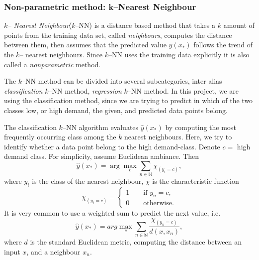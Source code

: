     \subsubsection{Non-parametric method: k--Nearest Neighbour}
        \emph{$k$-- Nearest Neighbour}($k$--NN) is a distance based method that takes a $k$ amount of points from the training data set, called \emph{neighbours}, computes the distance between them, then assumes that the predicted value $\hat{y}(x_{*})$ follows the trend of the $k$-- nearest neighbours. Since $k$--NN uses the training data explicitly it is also called a \emph{nonparametric} method.

    The $k$--NN method can be divided into several subcategories, inter alias \emph{classification} $k$--NN method, \emph{regression}  $k$--NN method. In this project, we are using the classification method, since we are trying to predict in which of the two classes low, or high demand, the given, and predicted data points belong.

    The classification  $k$--NN algorithm evaluates $\hat{y}(x_{*})$ by computing the most frequently occurring class among the $k$ nearest neighbours. Here, we try to identify whether a data point belong to the high demand-class. Denote $c=$ high demand class. For simplicity, assume Euclidean ambiance. Then
        \begin{equation*}
            \hat{y}(x_*) = \arg \max_{c}  \sum_{n \in \mathbb{N}} \chi_{(y_i = c)} ,
        \end{equation*}
    where $y_i$ is the class of the nearest neighbour,  $\chi$ is the characteristic function 
        \begin{equation*}
            \chi_{(y_i = c)} = 
            \begin{cases}
                1 \qquad \text{if } y_n = c, \\
                0 \qquad \text{otherwise}.
                
            \end{cases}
        \end{equation*}
    It is very common to use a weighted sum to predict the next value, i.e.
        \begin{equation*}
            \hat{y}(x_*) =  arg \max_{c}  \sum_{n \in \mathbb{N}} \frac{\chi_{(y_n = c)}}{d(x, x_n)},
        \end{equation*}
    where $d$ is the standard Euclidean metric, computing the distance between an input $x$, and a neighbour $x_n$. 

